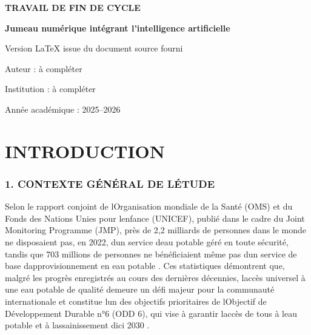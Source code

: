 \documentclass[12pt,a4paper,oneside]{report}
\begin{document}
\begin{titlepage}\centering\vspace*{2cm}
{\Large\textbf{TRAVAIL DE FIN DE CYCLE}\par}\vspace{2cm}
{\LARGE\textbf{Jumeau numérique intégrant l'intelligence artificielle}\par}\vspace{1cm}
{\large Version LaTeX issue du document source fourni\par}\vfill
{\large Auteur : à compléter\par}{\large Institution : à compléter\par}{\large Année académique : 2025--2026\par}
\end{titlepage}
\tableofcontents\listoffigures\listoftables\clearpage{}


\chapter*{INTRODUCTION}\label{introduction}

\subsection{1. CONTEXTE GÉNÉRAL DE
L\textquotesingle ÉTUDE}\label{contexte-guxe9nuxe9ral-de-luxe9tude}

Selon le rapport conjoint de l\textquotesingle Organisation mondiale de
la Santé (OMS) et du Fonds des Nations Unies pour
l\textquotesingle enfance (UNICEF), publié dans le cadre du Joint
Monitoring Programme (JMP), près de 2,2 milliards de personnes dans le
monde ne disposaient pas, en 2022, d\textquotesingle un service
d\textquotesingle eau potable géré en toute sécurité, tandis que 703
millions de personnes ne bénéficiaient même pas d\textquotesingle un
service de base d\textquotesingle approvisionnement en eau potable
\cite{ref1}. Ces statistiques démontrent que, malgré les progrès enregistrés
au cours des dernières décennies, l\textquotesingle accès universel à
une eau potable de qualité demeure un défi majeur pour la communauté
internationale et constitue l\textquotesingle un des objectifs
prioritaires de l\textquotesingle Objectif de Développement Durable n°6
(ODD 6), qui vise à garantir l\textquotesingle accès de tous à
l\textquotesingle eau potable et à l\textquotesingle assainissement
d\textquotesingle ici 2030 \cite{ref2}.
\end{document}
